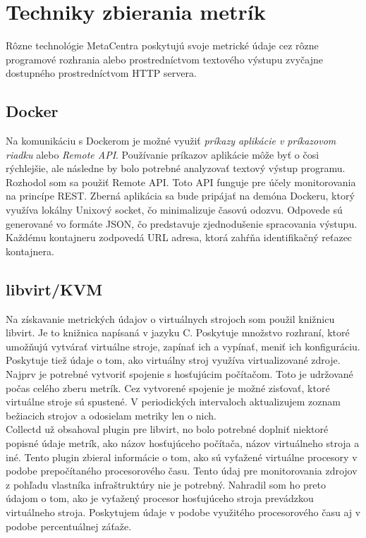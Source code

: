 \documentclass[printed,11pt,twoside,color,cover,table]{fithesis3}
\begin{document}
\section{Techniky zbierania metrík}
Rôzne technológie MetaCentra poskytujú svoje metrické údaje cez rôzne programové rozhrania alebo prostredníctvom textového výstupu zvyčajne
dostupného prostredníctvom HTTP servera.

\subsection{Docker}
Na komunikáciu s Dockerom je možné využiť \textit{príkazy aplikácie v príkazovom riadku} alebo \textit{Remote API}.
Používanie príkazov aplikácie môže byť o čosi rýchlejšie, ale následne by bolo potrebné analyzovať textový výstup programu.
Rozhodol som sa použiť Remote API. Toto API funguje pre účely monitorovania na princípe REST. Zberná aplikácia sa bude pripájať na demóna Dockeru, ktorý využíva lokálny Unixový socket, čo minimalizuje časovú odozvu.
Odpovede sú generované vo formáte JSON, čo predstavuje zjednodušenie spracovania výstupu. Každému kontajneru zodpovedá URL adresa, ktorá zahŕňa identifikačný reťazec kontajnera.

\subsection{libvirt/KVM}
Na získavanie metrických údajov o virtuálnych strojoch som použil knižnicu libvirt. Je to knižnica napísaná v jazyku C. Poskytuje množstvo
rozhraní, ktoré umožňujú vytvárať virtuálne stroje, zapínať ich a vypínať, meniť ich konfiguráciu. Poskytuje tiež údaje o tom, ako virtuálny
stroj využíva virtualizované zdroje. 
\\Najprv je potrebné vytvoriť spojenie s hosťujúcim počítačom. Toto je udržované počas celého zberu metrík. Cez vytvorené spojenie
je možné zisťovať, ktoré virtuálne stroje sú spustené. V periodických intervaloch aktualizujem zoznam bežiacich strojov a odosielam
metriky len o nich.
\\Collectd už obsahoval plugin pre libvirt, no bolo potrebné doplniť niektoré popisné údaje metrík, ako názov hosťujúceho počítača,
názov virtuálneho stroja a iné. Tento plugin zbieral informácie o tom, ako sú vyťažené virtuálne procesory v podobe prepočítaného procesorového času.
Tento údaj pre monitorovania zdrojov z pohľadu vlastníka infraštruktúry nie je potrebný. Nahradil som ho preto údajom o tom, ako je vyťažený
procesor hosťujúceho stroja prevádzkou virtuálneho stroja. Poskytujem údaje v podobe využitého procesorového času aj v podobe percentuálnej záťaže.
\end{document}
